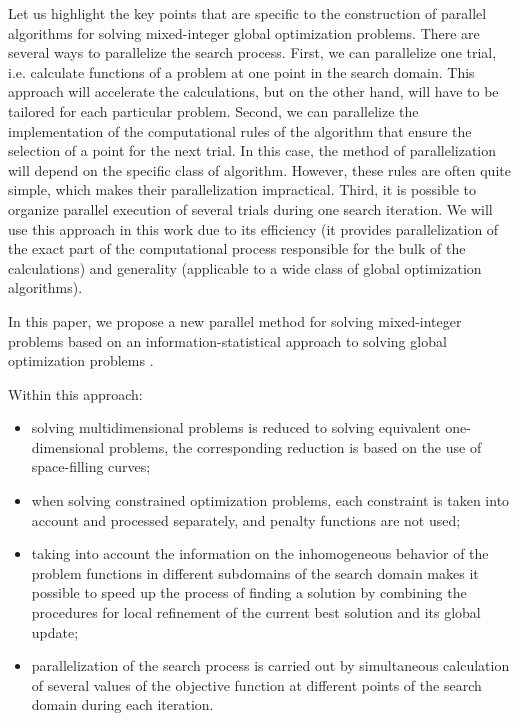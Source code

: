 \documentclass[
11pt,%
tightenlines,%
twoside,%
onecolumn,%
nofloats,%
nobibnotes,%
nofootinbib,%
superscriptaddress,%
noshowpacs,%
centertags]%
{revtex4}
\begin{document}
Let us highlight the key points that are specific to the construction of parallel algorithms for solving mixed-integer global optimization problems. There are several ways to parallelize the search process.
First, we can parallelize one trial, i.e. calculate functions of a problem at one point in the search domain. This approach will accelerate the calculations, but on the other hand, will have to be tailored for each particular problem.
Second, we can parallelize the implementation of the computational rules of the algorithm that ensure the selection of a point for the next trial. In this case, the method of parallelization will depend on the specific class of algorithm. However, these rules are often quite simple, which makes their parallelization impractical.
Third, it is possible to organize parallel execution of several trials during one search iteration. We will use this approach in this work due to its efficiency (it provides parallelization of the exact part of the computational process responsible for the bulk of the calculations) and generality (applicable to a wide class of global optimization algorithms).

In this paper, we propose a new parallel method for solving mixed-integer problems based on an information-statistical approach to solving global optimization problems \cite{Strongin2000,Strongin2013}.

Within this approach:
\begin{itemize}
    \item
    solving multidimensional problems is reduced to solving equivalent one-dimensional problems, the corresponding reduction is based on the use of space-filling curves;
    \item
    when solving constrained optimization problems, each constraint is taken into account and processed separately, and penalty functions are not used;
    \item
    taking into account the information on the inhomogeneous behavior of the problem functions in different subdomains of the search domain makes it possible to speed up the process of finding a solution by combining the procedures for local refinement of the current best solution and its global update;
    \item
    parallelization of the search process is carried out by simultaneous calculation of several values of the objective function at different points of the search domain during each iteration.
\end{itemize}
\end{document}

